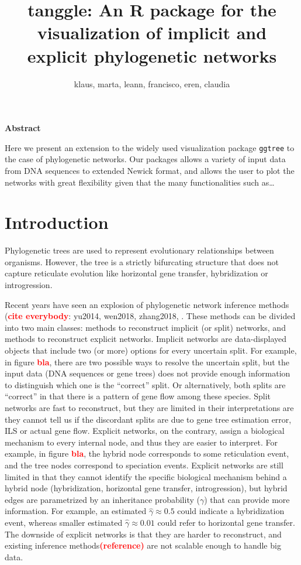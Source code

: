 \documentclass[]{article}
\title{tanggle: An R package for the visualization of implicit and explicit
phylogenetic networks}
\author{klaus, marta, leann, francisco, eren, claudia}
\date{}
\begin{document}
\maketitle

\begin{center}
\textbf{Abstract} 
\end{center}

Here we present an extension to the widely used visualization package
\texttt{ggtree} to the case of phylogenetic networks. Our packages
allows a variety of input data from DNA sequences to extended Newick
format, and allows the user to plot the networks with great flexibility
given that the many functionalities such as\ldots{}

\hypertarget{introduction}{%
\section{Introduction}\label{introduction}}

Phylogenetic trees are used to represent evolutionary relationships
between organisms. However, the tree is a strictly bifurcating structure
that does not capture reticulate evolution like horizontal gene
transfer, hybridization or introgression.

Recent years have seen an explosion of phylogenetic network inference
methods (\textcolor{red}{\textbf{cite everybody}}: yu2014, wen2018,
zhang2018,
\cite{Solis-Lemus2016, Huson2010, Gruenewald2013, Than2008, Yang2014}.
These methods can be divided into two main classes: methods to
reconstruct implicit (or split) networks, and methods to reconstruct
explicit networks. Implicit networks are data-displayed objects that
include two (or more) options for every uncertain split. For example, in
figure \textcolor{red}{\textbf{bla}}, there are two possible ways to
resolve the uncertain split, but the input data (DNA sequences or gene
trees) does not provide enough information to distinguish which one is
the ``correct'' split. Or alternatively, both splits are ``correct'' in
that there is a pattern of gene flow among these species. Split networks
are fast to reconstruct, but they are limited in their interpretations
are they cannot tell us if the discordant splits are due to gene tree
estimation error, ILS or actual gene flow. Explicit networks, on the
contrary, assign a biological mechanism to every internal node, and thus
they are easier to interpret. For example, in figure
\textcolor{red}{\textbf{bla}}, the hybrid node corresponds to some
reticulation event, and the tree nodes correspond to speciation events.
Explicit networks are still limited in that they cannot identify the
specific biological mechanism behind a hybrid node (hybridization,
horizontal gene transfer, introgression), but hybrid edges are
parametrized by an inheritance probability (\(\gamma\)) that can provide
more information. For example, an estimated \(\hat{\gamma} \approx 0.5\)
could indicate a hybridization event, whereas smaller estimated
\(\hat{\gamma} \approx 0.01\) could refer to horizontal gene transfer.
The downside of explicit networks is that they are harder to
reconstruct, and existing inference
methods\textcolor{red}{\textbf{(reference)}} are not scalable enough to
handle big data.
\end{document}
